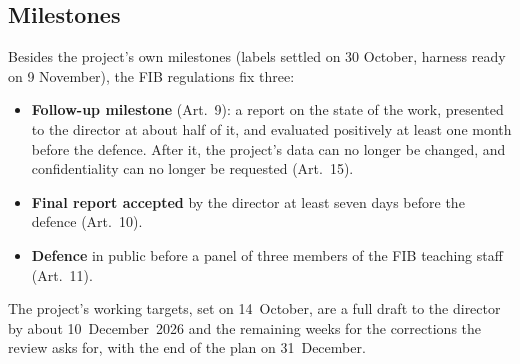 
\subsection{Milestones}
\label{subsec:milestones}

Besides the project's own milestones (labels settled on 30 October,
harness ready on 9 November), the FIB regulations fix three:

\begin{itemize}
    \item \textbf{Follow-up milestone} (Art.~9): a report on the state
    of the work, presented to the director at about half of it, and
    evaluated positively at least one month before the defence. After
    it, the project's data can no longer be changed, and
    confidentiality can no longer be requested (Art.~15).
    \item \textbf{Final report accepted} by the director at least
    seven days before the defence (Art.~10).
    \item \textbf{Defence} in public before a panel of three members
    of the FIB teaching staff (Art.~11).
\end{itemize}
The project's working targets, set on 14~October, are a full draft to
the director by about 10~December~2026 and the remaining weeks for the
corrections the review asks for, with the end of the plan on
31~December.
